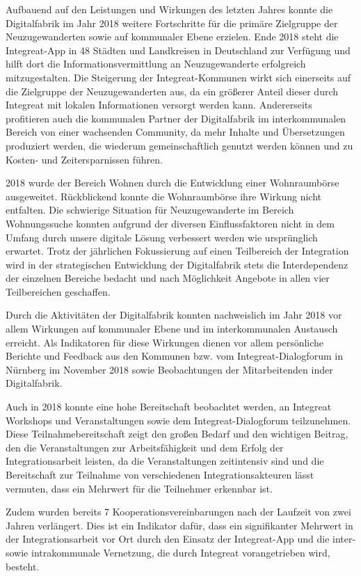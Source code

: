 \documentclass[12pt, a4paper]{article} %
\begin{document}
Aufbauend auf den Leistungen und Wirkungen des letzten Jahres konnte die
Digitalfabrik im Jahr 2018 weitere Fortschritte für die primäre
Zielgruppe der Neuzugewanderten sowie auf kommunaler Ebene erzielen.
Ende 2018 steht die Integreat-App in 48 Städten und Landkreisen in
Deutschland zur Verfügung und hilft dort die Informationsvermittlung an
Neuzugewanderte erfolgreich mitzugestalten. Die Steigerung der
Integreat-Kommunen wirkt sich einerseits auf die Zielgruppe der
Neuzugewanderten aus, da ein größerer Anteil dieser durch Integreat mit
lokalen Informationen versorgt werden kann. Andererseits profitieren
auch die kommunalen Partner der Digitalfabrik im interkommunalen Bereich
von einer wachsenden Community, da mehr Inhalte und Übersetzungen
produziert werden, die wiederum gemeinschaftlich genutzt werden können
und zu Kosten- und Zeitersparnissen führen.

2018 wurde der Bereich Wohnen durch die Entwicklung einer Wohnraumbörse
ausgeweitet. Rückblickend konnte die Wohnraumbörse ihre Wirkung nicht
entfalten. Die schwierige Situation für Neuzugewanderte im Bereich
Wohnungssuche konnten aufgrund der diversen Einflussfaktoren nicht in
dem Umfang durch unsere digitale Lösung verbessert werden wie
ursprünglich erwartet. Trotz der jährlichen Fokussierung auf einen
Teilbereich der Integration wird in der strategischen Entwicklung der
Digitalfabrik stets die Interdependenz der einzelnen Bereiche bedacht
und nach Möglichkeit Angebote in allen vier Teilbereichen geschaffen.

Durch die Aktivitäten der Digitalfabrik konnten nachweislich im Jahr
2018 vor allem Wirkungen auf kommunaler Ebene und im interkommunalen
Austausch erreicht. Als Indikatoren für diese Wirkungen dienen vor allem
persönliche Berichte und Feedback aus den Kommunen bzw. vom
Integreat-Dialogforum in Nürnberg im November 2018 sowie Beobachtungen
der Mitarbeitenden inder Digitalfabrik.

Auch in 2018 konnte eine hohe Bereitschaft beobachtet werden, an
Integreat Workshops und Veranstaltungen sowie dem Integreat-Dialogforum
teilzunehmen. Diese Teilnahmebereitschaft zeigt den großen Bedarf und
den wichtigen Beitrag, den die Veranstaltungen zur Arbeitsfähigkeit und
dem Erfolg der Integrationsarbeit leisten, da die Veranstaltungen
zeitintensiv sind und die Bereitschaft zur Teilnahme von verschiedenen
Integrationsakteuren lässt vermuten, dass ein Mehrwert für die
Teilnehmer erkennbar ist.

Zudem wurden bereits 7 Kooperationsvereinbarungen nach der Laufzeit von
zwei Jahren verlängert. Dies ist ein Indikator dafür, dass ein
signifikanter Mehrwert in der Integrationsarbeit vor Ort durch den
Einsatz der Integreat-App und die inter- sowie intrakommunale
Vernetzung, die durch Integreat vorangetrieben wird, besteht.
\end{document}
